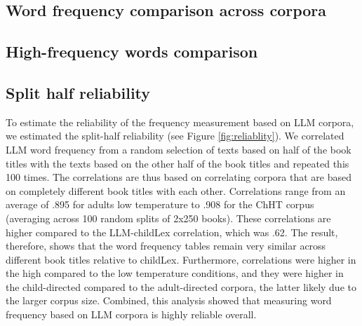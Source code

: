 \documentclass[manuscript]{stjour}
\begin{document}
\clearpage  


\subsection{Word frequency comparison across corpora}

\begin{figure}[!htbp]
    \label{fig:scatterplotfacets}
\end{figure}

\clearpage


\subsection{High-frequency words comparison}

\begin{figure}[!htbp]
    \label{fig:scatterplotfacetszoom}
\end{figure}

\clearpage


\subsection{Split half reliability}

To estimate the reliability of the frequency measurement based on LLM corpora, we estimated the split-half reliability (see Figure \ref{fig:reliablity}). We correlated LLM word frequency from a random selection of texts based on half of the book titles with the texts based on the other half of the book titles and repeated this 100 times. The correlations are thus based on correlating corpora that are based on completely different book titles with each other. Correlations range from an average of .895 for adults low temperature to .908 for the ChHT corpus (averaging across 100 random splits of 2x250 books). These correlations are higher compared to the LLM-childLex correlation, which was .62. The result, therefore, shows that the word frequency tables remain very similar across different book titles relative to childLex. Furthermore, correlations were higher in the high compared to the low temperature conditions, and they were higher in the child-directed compared to the adult-directed corpora, the latter likely due to the larger corpus size. Combined, this analysis showed that measuring word frequency based on LLM corpora is highly reliable overall.
\end{document}
